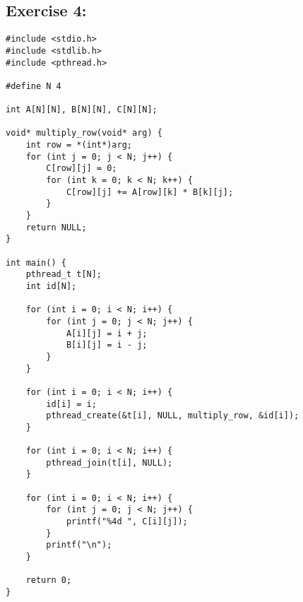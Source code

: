 \documentclass{article}
\begin{document}
\subsection*{Exercise 4:}
\begin{verbatim}
#include <stdio.h>
#include <stdlib.h>
#include <pthread.h>

#define N 4

int A[N][N], B[N][N], C[N][N];

void* multiply_row(void* arg) {
    int row = *(int*)arg;
    for (int j = 0; j < N; j++) {
        C[row][j] = 0;
        for (int k = 0; k < N; k++) {
            C[row][j] += A[row][k] * B[k][j];
        }
    }
    return NULL;
}

int main() {
    pthread_t t[N];
    int id[N];

    for (int i = 0; i < N; i++) {
        for (int j = 0; j < N; j++) {
            A[i][j] = i + j;
            B[i][j] = i - j;
        }
    }

    for (int i = 0; i < N; i++) {
        id[i] = i;
        pthread_create(&t[i], NULL, multiply_row, &id[i]);
    }

    for (int i = 0; i < N; i++) {
        pthread_join(t[i], NULL);
    }

    for (int i = 0; i < N; i++) {
        for (int j = 0; j < N; j++) {
            printf("%4d ", C[i][j]);
        }
        printf("\n");
    }

    return 0;
}
\end{verbatim}
\end{document}
